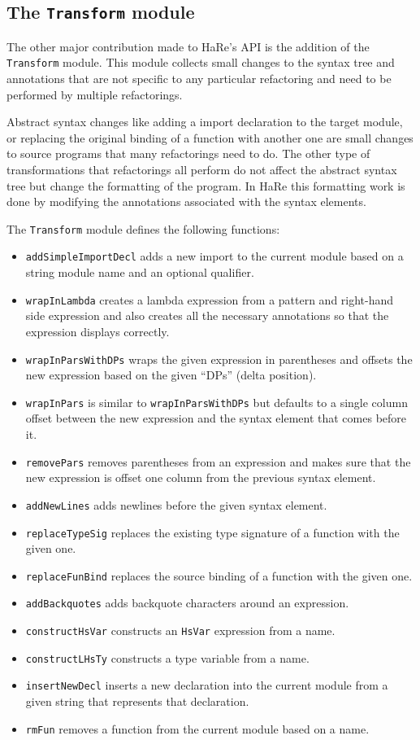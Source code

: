 \subsection{The \texttt{Transform} module}

The other major contribution made to HaRe's API is the addition of the \texttt{Transform} module. This module collects small changes to the syntax tree and annotations that are not specific to any particular refactoring and need to be performed by multiple refactorings.

Abstract syntax changes like adding a import declaration to the target module, or replacing the original binding of a function with another one are small changes to source programs that many refactorings need to do. The other type of transformations that refactorings all perform do not affect the abstract syntax tree but change the formatting of the program. In HaRe this formatting work is done by modifying the annotations associated with the syntax elements. 

The \texttt{Transform} module defines the following functions:

\begin{itemize}
\item \texttt{addSimpleImportDecl} adds a new import to the current module based on a string module name and an optional qualifier.
\item \texttt{wrapInLambda} creates a lambda expression from a pattern and right-hand side expression and also creates all the necessary annotations so that the expression displays correctly.
\item \texttt{wrapInParsWithDPs} wraps the given expression in parentheses and offsets the new expression based on the given ``DPs'' (delta position).
\item \texttt{wrapInPars} is similar to \texttt{wrapInParsWithDPs} but defaults to a single column offset between the new expression and the syntax element that comes before it.
\item  \texttt{removePars} removes parentheses from an expression and makes sure that the new expression is offset one column from the previous syntax element.
\item \texttt{addNewLines} adds newlines before the given syntax element.
\item \texttt{replaceTypeSig} replaces the existing type signature of a function with the given one.
\item \texttt{replaceFunBind} replaces the source binding of a function with the given one.
\item \texttt{addBackquotes} adds backquote characters around an expression.
\item \texttt{constructHsVar} constructs an \texttt{HsVar} expression from a name.
\item \texttt{constructLHsTy} constructs a type variable from a name.
\item \texttt{insertNewDecl} inserts a new declaration into the current module from a given string that represents that declaration.
\item \texttt{rmFun} removes a function from the current module based on a name.
\end{itemize}


